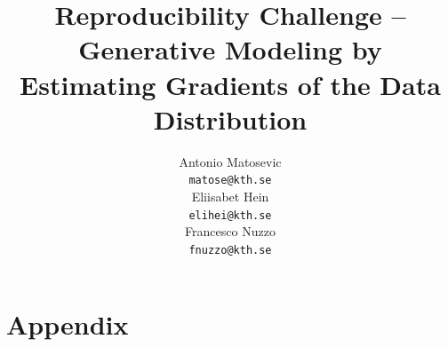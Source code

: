 \documentclass{article}
\title{Reproducibility Challenge -- Generative Modeling by Estimating Gradients of the Data Distribution}
\author{%
  Antonio Matosevic \\
  \texttt{matose@kth.se} \\
  \And
  Eliisabet Hein \\
  \texttt{elihei@kth.se} \\
  \And
  Francesco Nuzzo \\
  \texttt{fnuzzo@kth.se} \\
}
\begin{document}
\maketitle




















\small




\clearpage
\section*{Appendix}

\vspace{5cm}
\end{document}
